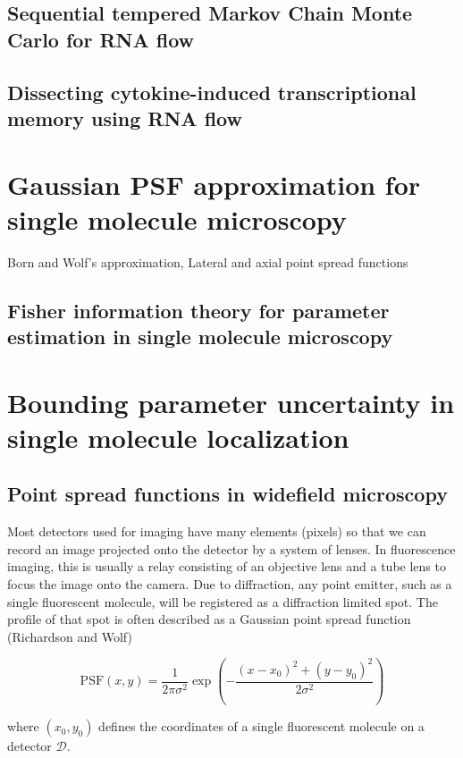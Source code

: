 \documentclass{ucetd}
\begin{document}
\subsection{Sequential tempered Markov Chain Monte Carlo for RNA flow}

\subsection{Dissecting cytokine-induced transcriptional memory using RNA flow}

\section{Gaussian PSF approximation for single molecule microscopy}

Born and Wolf's approximation, Lateral and axial point spread functions

\subsection{Fisher information theory for parameter estimation in single molecule microscopy}

\section{Bounding parameter uncertainty in single molecule localization}

\subsection{Point spread functions in widefield microscopy}

Most detectors used for imaging have many elements (pixels) so that we can record an image projected onto the detector by a system of lenses. In fluorescence imaging, this is usually a relay consisting of an objective lens and a tube lens to focus the image onto the camera. Due to diffraction, any point emitter, such as a single fluorescent molecule, will be registered as a diffraction limited spot. The profile of that spot is often described as a Gaussian point spread function (Richardson and Wolf)

\begin{equation}
\mathrm{PSF}(x,y) = \frac{1}{2\pi\sigma^{2}}\exp\left(-\frac{(x-x_{0})^{2}+(y-y_{0})^{2}}{2\sigma^{2}}\right)
\end{equation}

where $(x_0,y_0)$ defines the coordinates of a single fluorescent molecule on a detector $\mathcal{D}$. 
\end{document}
